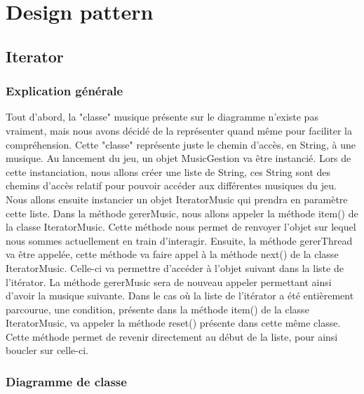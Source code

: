 \newpage
\section{Design pattern}
\subsection{Iterator}

\subsubsection{Explication générale}

Tout d'abord, la "classe" musique présente sur le diagramme n'existe pas vraiment, mais nous avons décidé de la représenter quand même pour faciliter la compréhension. Cette "classe" représente juste le chemin d'accès, en String, à une musique.
Au lancement du jeu, un objet MusicGestion va être instancié.
Lors de cette instanciation, nous allons créer une liste de String, ces String sont des chemins d'accès relatif pour pouvoir accéder aux différentes musiques du jeu.
Nous allons ensuite instancier un objet IteratorMusic qui prendra en paramètre cette liste.
Dans la méthode gererMusic, nous allons appeler la méthode item() de la classe IteratorMusic.
Cette méthode nous permet de renvoyer l'objet sur lequel nous sommes actuellement en train d'interagir.
Ensuite, la méthode gererThread va être appelée, cette méthode va faire appel à la méthode next() de la classe IteratorMusic.
Celle-ci va permettre d'accéder à l'objet suivant dans la liste de l'itérator.
La méthode gererMusic sera de nouveau appeler permettant ainsi d'avoir la musique suivante.
Dans le cas où la liste de l'itérator a été entièrement parcourue, une condition, présente dans la méthode item() de la classe IteratorMusic, va appeler la méthode reset() présente dans cette même classe.
Cette méthode permet de revenir directement au début de la liste, pour ainsi boucler sur celle-ci.


\subsubsection{Diagramme de classe}

